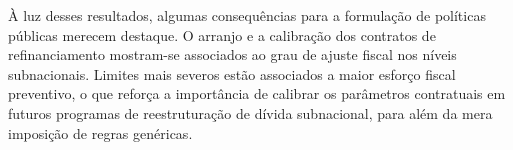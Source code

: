 À luz desses resultados, algumas consequências para a formulação de políticas públicas merecem destaque. O arranjo e a calibração dos contratos de refinanciamento mostram-se associados ao grau de ajuste fiscal nos níveis subnacionais. Limites mais severos estão associados a maior esforço fiscal preventivo, o que reforça a importância de calibrar os parâmetros contratuais em futuros programas de reestruturação de dívida subnacional, para além da mera imposição de regras genéricas.